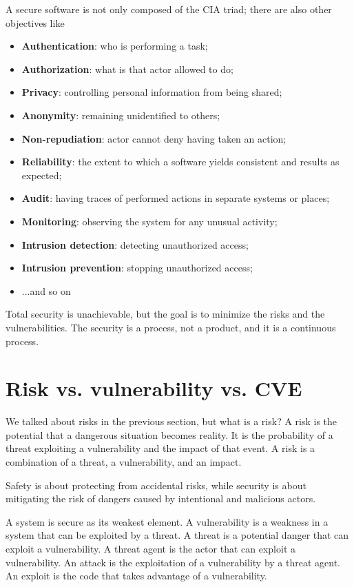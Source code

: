 A secure software is not only composed of the CIA triad; there are also other objectives like~\cite{st-slides}
\begin{itemize}
  \item \textbf{Authentication}: who is performing a task;
  \item \textbf{Authorization}: what is that actor allowed to do;
  \item \textbf{Privacy}: controlling personal information from being shared;
  \item \textbf{Anonymity}: remaining unidentified to others;
  \item \textbf{Non-repudiation}: actor cannot deny having taken an action;
  \item \textbf{Reliability}: the extent to which a software yields consistent and results as expected;
  \item \textbf{Audit}: having traces of performed actions in separate systems or places;
  \item \textbf{Monitoring}: observing the system for any unusual activity;
  \item \textbf{Intrusion detection}: detecting unauthorized access;
  \item \textbf{Intrusion prevention}: stopping unauthorized access;
  \item ...and so on
\end{itemize}

Total security is unachievable, but the goal is to minimize the risks and the vulnerabilities. The security is a process, not a product, and it is a continuous process.~\cite{st-slides}

\section{Risk vs. vulnerability vs. CVE}

We talked about risks in the previous section, but what is a risk? A risk is the potential that a dangerous situation becomes reality. It is the probability of a threat exploiting a vulnerability and the impact of that event. A risk is a combination of a threat, a vulnerability, and an impact.

Safety is about protecting from accidental risks, while security is about mitigating the risk of dangers caused by intentional and malicious actors.

A system is secure as its weakest element. A vulnerability is a weakness in a system that can be exploited by a threat. A threat is a potential danger that can exploit a vulnerability. A threat agent is the actor that can exploit a vulnerability. An attack is the exploitation of a vulnerability by a threat agent. An exploit is the code that takes advantage of a vulnerability.

